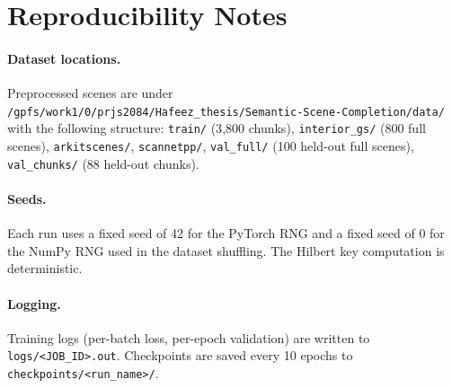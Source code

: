 \section{Reproducibility Notes}
\label{app:repro}

\paragraph{Dataset locations.} Preprocessed scenes are under \texttt{/gpfs/work1/0/prjs2084/Hafeez\_thesis/Semantic-Scene-Completion/data/} with the following structure: \texttt{train/} (3{,}800 chunks), \texttt{interior\_gs/} (800 full scenes), \texttt{arkitscenes/}, \texttt{scannetpp/}, \texttt{val\_full/} (100 held-out full scenes), \texttt{val\_chunks/} (88 held-out chunks).

\paragraph{Seeds.} Each run uses a fixed seed of 42 for the PyTorch RNG and a fixed seed of 0 for the NumPy RNG used in the dataset shuffling. The Hilbert key computation is deterministic.

\paragraph{Logging.} Training logs (per-batch loss, per-epoch validation) are written to \texttt{logs/<JOB\_ID>.out}. Checkpoints are saved every 10 epochs to \texttt{checkpoints/<run\_name>/}.